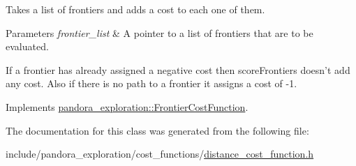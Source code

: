 \-Takes a list of frontiers and adds a cost to each one of them. 


\begin{DoxyParams}{\-Parameters}
{\em frontier\-\_\-list} & \-A pointer to a list of frontiers that are to be evaluated.\\
\hline
\end{DoxyParams}
\-If a frontier has already assigned a negative cost then score\-Frontiers doesn't add any cost. \-Also if there is no path to a frontier it assigns a cost of -\/1. 

\-Implements \hyperlink{classpandora__exploration_1_1_frontier_cost_function_a1049bc25e934365fdf3a1a6ab88c4cca}{pandora\-\_\-exploration\-::\-Frontier\-Cost\-Function}.



\-The documentation for this class was generated from the following file\-:\begin{DoxyCompactItemize}
\item 
include/pandora\-\_\-exploration/cost\-\_\-functions/\hyperlink{distance__cost__function_8h}{distance\-\_\-cost\-\_\-function.\-h}\end{DoxyCompactItemize}
